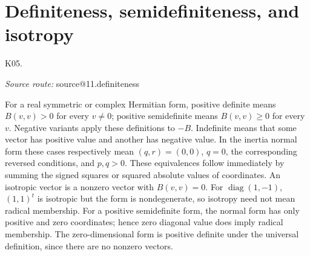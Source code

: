 \documentclass[11pt,a4paper]{book}
\makeatletter
\theoremstyle{definition}\newtheorem{definition}[theorem]{Definition}
\theoremstyle{remark}\newtheorem{remark}[theorem]{Remark}
\DeclareMathOperator{\diag}{diag}\DeclareMathOperator{\id}{id}
\newcommand{\Kentry}[2]{\section{#2}\label{k:#1}\noindent\textsf{\small K05.\detokenize{#1}}\par
  \begingroup\small\color{black!65}\textit{Source route: }\csname source@#1\endcsname\par\endgroup}
\makeatother
\begin{document}
\Kentry{11.definiteness}{Definiteness, semidefiniteness, and isotropy}
For a real symmetric or complex Hermitian form, positive definite means $B(v,v)>0$ for every $v\ne0$; positive semidefinite means $B(v,v)\ge0$ for every $v$. Negative variants apply these definitions to $-B$. Indefinite means that some vector has positive value and another has negative value. In the inertia normal form these cases respectively mean $(q,r)=(0,0)$, $q=0$, the corresponding reversed conditions, and $p,q>0$. These equivalences follow immediately by summing the signed squares or squared absolute values of coordinates. An isotropic vector is a nonzero vector with $B(v,v)=0$. For $\diag(1,-1)$, $(1,1)^t$ is isotropic but the form is nondegenerate, so isotropy need not mean radical membership. For a positive semidefinite form, the normal form has only positive and zero coordinates; hence zero diagonal value does imply radical membership. The zero-dimensional form is positive definite under the universal definition, since there are no nonzero vectors.
\end{document}
